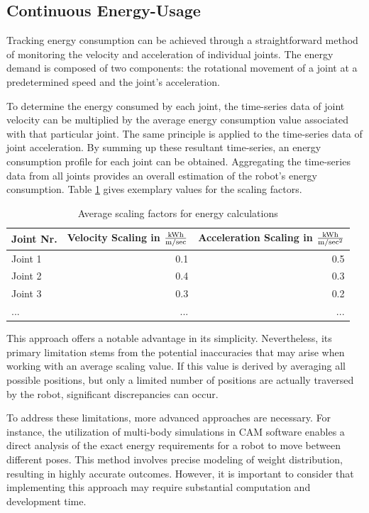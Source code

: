 \subsection{Continuous Energy-Usage}
Tracking energy consumption can be achieved through a straightforward method of monitoring the velocity and acceleration of individual joints. The energy demand is composed of two components: the rotational movement of a joint at a predetermined speed and the joint's acceleration.

To determine the energy consumed by each joint, the time-series data of joint velocity can be multiplied by the average energy consumption value associated with that particular joint. The same principle is applied to the time-series data of joint acceleration. By summing up these resultant time-series, an energy consumption profile for each joint can be obtained. Aggregating the time-series data from all joints provides an overall estimation of the robot's energy consumption. Table \ref{scalers} gives exemplary values for the scaling factors.\newline


\begin{table}[H]
	\centering
	\begin{tabular}{||l|r|r||}
		Joint Nr.  & Velocity Scaling in \(\frac{\si[per-mode=symbol]{\kWh}}{\si[per-mode=symbol]{\m\per\sec }}\)& Acceleration Scaling in \(\frac{\si[per-mode=symbol]{\kWh}}{\si[per-mode=symbol]{\m\per\sec\squared }}\) \\
		\hline
		\hline
		\hline
		Joint 1	& 0.1 & 0.5\\
		Joint 2	&  0.4& 0.3 \\
		Joint 3	& 0.3& 0.2\\
		...& ...& ...\\
		
		\hline
		\hline
	\end{tabular}
	
	\caption{Average scaling factors for energy calculations}
	\label{scalers}
\end{table}


This approach offers a notable advantage in its simplicity. Nevertheless, its primary limitation stems from the potential inaccuracies that may arise when working with an average scaling value. If this value is derived by averaging all possible positions, but only a limited number of positions are actually traversed by the robot, significant discrepancies can occur.


To address these limitations, more advanced approaches are necessary. For instance, the utilization of multi-body simulations in CAM software enables a direct analysis of the exact energy requirements for a robot to move between different poses. This method involves precise modeling of weight distribution, resulting in highly accurate outcomes. However, it is important to consider that implementing this approach may require substantial computation and development time.


